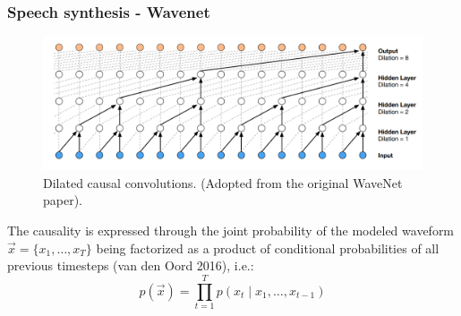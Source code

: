 \documentclass[a4paper,9pt]{beamer}
\theoremstyle{mytheoremstyle}
\begin{document}


\begin{frame}
\frametitle{Speech synthesis - Wavenet}
\begin{figure}
\begin{center}
  \includegraphics[width=\textwidth]{res/dilated_convolutions.png}
\end{center}
	\caption{Dilated causal convolutions. (Adopted from the original WaveNet paper).}
\end{figure}
The causality is expressed through the joint probability of the modeled waveform 
$\vec{x} = \{ x_1, \dots, x_T \}$
being factorized as a product of conditional probabilities of all previous timesteps (van den Oord 2016), i.e.:
\begin{equation}
p\left(\vec{x}\right) = \prod_{t=1}^{T} p\left(x_t \mid x_1, \dots ,x_{t-1}\right)
\end{equation}
\end{frame}
\end{document}

